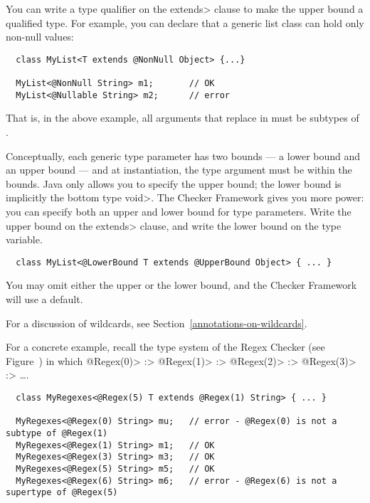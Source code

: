 You can write a type qualifier on the \<extends> clause to make the upper
bound a qualified type.  For example, you can declare that a generic list class can hold only non-null values:

\begin{Verbatim}
  class MyList<T extends @NonNull Object> {...}

  MyList<@NonNull String> m1;       // OK
  MyList<@Nullable String> m2;      // error
\end{Verbatim}

That is, in the above example, all
arguments that replace  in  must be subtypes of
.



Conceptually, each generic type parameter has two bounds --- a lower bound
and an upper bound --- and at instantiation, the type argument must be
within the bounds.  Java only allows you to specify the upper bound; the
lower bound is implicitly the bottom type \<void>.  The Checker Framework
gives you more power:  you can specify both an upper and lower bound for
type parameters.
Write the upper bound on the \<extends> clause, and
write the lower bound on the type variable.

\begin{Verbatim}
  class MyList<@LowerBound T extends @UpperBound Object> { ... }
\end{Verbatim}

You may omit either the upper or the lower bound, and the Checker Framework
will use a default.

For a discussion of wildcards, see Section~\ref{annotations-on-wildcards}.

For a concrete example, recall the type system of the Regex Checker (see
Figure~) in which
 \<@Regex(0)> :>
 \<@Regex(1)> :>
 \<@Regex(2)> :>
 \<@Regex(3)> :> \ldots.

\begin{Verbatim}
  class MyRegexes<@Regex(5) T extends @Regex(1) String> { ... }

  MyRegexes<@Regex(0) String> mu;   // error - @Regex(0) is not a subtype of @Regex(1)
  MyRegexes<@Regex(1) String> m1;   // OK
  MyRegexes<@Regex(3) String> m3;   // OK
  MyRegexes<@Regex(5) String> m5;   // OK
  MyRegexes<@Regex(6) String> m6;   // error - @Regex(6) is not a supertype of @Regex(5)
\end{Verbatim}

